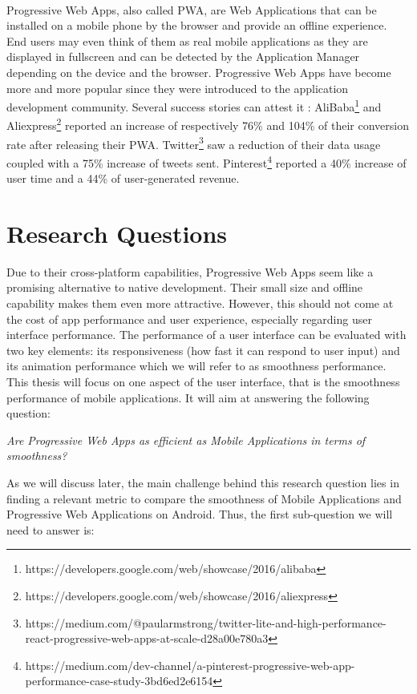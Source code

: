 \documentclass{kththesis}
\begin{document}
\paragraph{}
Progressive Web Apps, also called PWA, are Web Applications that can be installed on a mobile phone by the browser and provide an offline experience. End users may even think of them as real mobile applications as they are displayed in fullscreen and can be detected by the Application Manager depending on the device and the browser.
Progressive Web Apps have become more and more popular since they were introduced to the application development community. Several success stories can attest it : AliBaba\footnote{https://developers.google.com/web/showcase/2016/alibaba} and Aliexpress\footnote{https://developers.google.com/web/showcase/2016/aliexpress} reported an increase of respectively 76\% and 104\% of their conversion rate after releasing their PWA. Twitter\footnote{https://medium.com/@paularmstrong/twitter-lite-and-high-performance-react-progressive-web-apps-at-scale-d28a00e780a3} saw a reduction of their data usage coupled with a 75\% increase of tweets sent. Pinterest\footnote{https://medium.com/dev-channel/a-pinterest-progressive-web-app-performance-case-study-3bd6ed2e6154} reported a 40\% increase of user time and a 44\% of user-generated revenue. 



\section{Research Questions}

Due to their cross-platform capabilities, Progressive Web Apps seem like a promising alternative to native development. Their small size and offline capability makes them even more attractive. However, this should not come at the cost of app performance and user experience, especially regarding user interface performance. The performance of a user interface can be evaluated with two key elements: its responsiveness (how fast it can respond to user input) and its animation performance which we will refer to as smoothness performance. 
This thesis will focus on one aspect of the user interface, that is the smoothness performance of mobile applications. It will aim at answering the following question: 
\begin{center}
    \textit{Are Progressive Web Apps as efficient as Mobile Applications in terms of smoothness?}
\end{center}
As we will discuss later, the main challenge behind this research question lies in finding a relevant metric to compare the smoothness of Mobile Applications and Progressive Web Applications on Android. Thus, the first sub-question we will need to answer is: \newline
\end{document}
